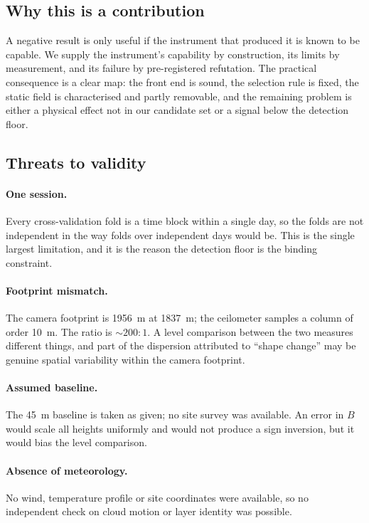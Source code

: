 \documentclass[11pt,a4paper]{article}
\begin{document}
\subsection{Why this is a contribution}

A negative result is only useful if the instrument that produced it is known to be capable. We
supply the instrument's capability by construction, its limits by measurement, and its failure
by pre-registered refutation. The practical consequence is a clear map: the front end is sound,
the selection rule is fixed, the static field is characterised and partly removable, and the
remaining problem is either a physical effect not in our candidate set or a signal below the
detection floor.

\subsection{Threats to validity}

\paragraph{One session.} Every cross-validation fold is a time block within a single day, so
the folds are not independent in the way folds over independent days would be. This is the
single largest limitation, and it is the reason the detection floor is the binding constraint.

\paragraph{Footprint mismatch.} The camera footprint is \SI{1956}{\metre} at
\SI{1837}{\metre}; the ceilometer samples a column of order \SI{10}{\metre}. The ratio is
$\sim 200{:}1$. A level comparison between the two measures different things, and part of the
dispersion attributed to ``shape change'' may be genuine spatial variability within the camera
footprint.

\paragraph{Assumed baseline.} The \SI{45}{\metre} baseline is taken as given; no site
survey was available. An error in $B$ would scale all heights uniformly and would not produce
a sign inversion, but it would bias the level comparison.

\paragraph{Absence of meteorology.} No wind, temperature profile or site coordinates were
available, so no independent check on cloud motion or layer identity was possible.
\end{document}
